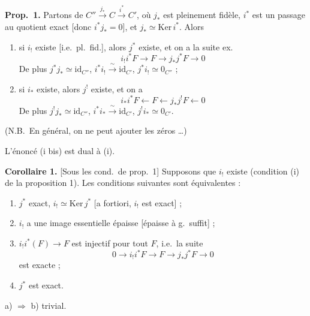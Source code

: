 \documentclass[11pt,a4paper]{article}
\begin{document}
\textbf{Prop.\ 1.} Partons de $C'' \xrightarrow{\ j_{*}\ } C
\xrightarrow{\ i^{*}\ } C'$, où $j_{*}$ est pleinement fidèle, $i^{*}$ est un
passage au quotient exact [donc $i^{*} j_{*} = 0$], et
$j_{*} \simeq \mathrm{Ker}\, i^{*}$. Alors
\begin{enumerate}
\item[(i)] si $i_{!}$ existe [i.e.\ pl.\ fid.], alors $j^{*}$ existe, et on a
      la suite ex.
      \[
        i_{!} i^{*} F \longrightarrow F \longrightarrow j_{*} j^{*} F
        \longrightarrow 0
      \]
      De plus \quad
      $j^{*} j_{*} \simeq \mathrm{id}_{C''}$, \quad
      $i^{*} i_{!} \xrightarrow{\ \sim\ } \mathrm{id}_{C'}$, \quad
      $j^{*} i_{!} \simeq 0_{C''}$ ;
\item[(i bis)] si $i_{*}$ existe, alors $j^{!}$ existe, et on a
      \[
        i_{*} i^{*} F \longleftarrow F \longleftarrow j_{*} j^{!} F
        \longleftarrow 0
      \]
      De plus \quad
      $j^{!} j_{*} \simeq \mathrm{id}_{C''}$, \quad
      $i^{*} i_{*} \xrightarrow{\ \sim\ } \mathrm{id}_{C'}$, \quad
      $j^{!} i_{*} \simeq 0_{C'}$.
\end{enumerate}

(N.B.\ En général, on ne peut  ajouter les zéros \ldots)

L'énoncé (i bis) est dual à (i).

\textbf{Corollaire 1.} [Sous les cond.\ de prop.\ 1] Supposons que $i_{!}$
existe (condition (i) de la proposition 1). Les conditions suivantes sont
équivalentes :
\begin{enumerate}
\item[a)] $j^{*}$ exact, $i_{!} \simeq \mathrm{Ker}\, j^{*}$ [a fortiori,
      $i_{!}$ est \struck{\ill{}} exact] ;
\item[b)] $i_{!}$ a une image essentielle épaisse [épaisse à g.\ suffit] ;
\item[c)] $i_{!} i^{*}(F) \longrightarrow F$ est injectif pour tout $F$,
      i.e.\ la suite
      \[
        0 \longrightarrow i_{!} i^{*} F \longrightarrow F \longrightarrow
        j_{*} j^{*} F \longrightarrow 0
      \]
      est exacte ;
\item[d)] $j^{*}$ est exact.
\end{enumerate}

a) $\Longrightarrow$ b) trivial.
\end{document}
